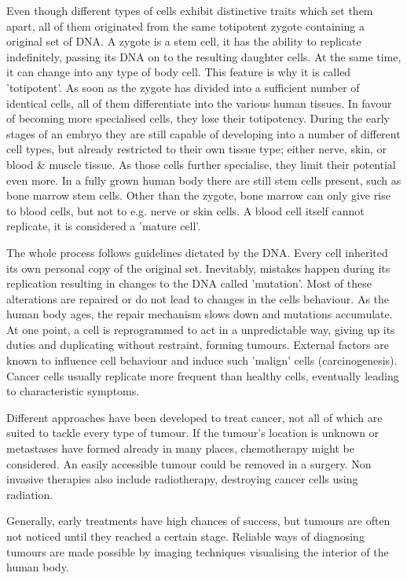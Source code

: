 Even though different types of cells exhibit distinctive traits which set them apart, all of them originated from the same totipotent zygote containing a original set of DNA.
A zygote is a stem cell, it has the ability to replicate indefinitely, passing its DNA on to the resulting daughter cells.
At the same time, it can change into any type of body cell. This feature is why it is called 'totipotent'.
As soon as the zygote has divided into a sufficient number of identical cells, all of them differentiate into the various human tissues.
In favour of becoming more specialised cells, they lose their totipotency.
During the early stages of an embryo they are still capable of developing into a number of different cell types, but already restricted to their own tissue type; either nerve, skin, or blood \& muscle tissue.
As those cells further specialise, they limit their potential even more.
In a fully grown human body there are still stem cells present, such as bone marrow stem cells.
Other than the zygote, bone marrow can only give rise to blood cells, but not to e.g. nerve or skin cells.
A blood cell itself cannot replicate, it is considered a 'mature cell'.

The whole process follows guidelines dictated by the DNA. Every cell inherited its own personal copy of the original set.
Inevitably, mistakes happen during its replication resulting in changes to the DNA called 'mutation'.
Most of these alterations are repaired or do not lead to changes in the cells behaviour.
As the human body ages, the repair mechanism slows down and mutations accumulate.
At one point, a cell is reprogrammed to act in a unpredictable way, giving up its duties and duplicating without restraint, forming tumours.
External factors are known to influence cell behaviour and induce such 'malign' cells (carcinogenesis).
Cancer cells usually replicate more frequent than healthy cells, eventually leading to characteristic symptoms.

Different approaches have been developed to treat cancer, not all of which are suited to tackle every type of tumour.
If the tumour's location is unknown or metastases have formed already in many places, chemotherapy might be considered.
An easily accessible tumour could be removed in a surgery.
Non invasive therapies also include radiotherapy, destroying cancer cells using radiation.

Generally, early treatments have high chances of success, but tumours are often not noticed until they reached a certain stage. 
Reliable ways of diagnosing tumours are made possible by imaging techniques visualising the interior of the human body.  \cite{Baumann2017}

